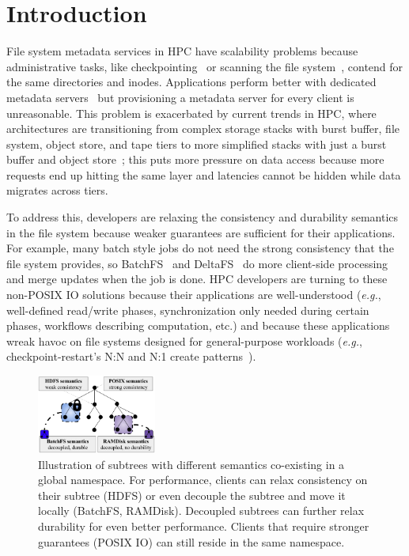 \section{Introduction}

File system metadata services in HPC have scalability problems because
administrative tasks, like checkpointing~\cite{bent_plfs_2009} or scanning the
file system~\cite{zheng:pdsw2014-batchfs}, contend for the same directories and
inodes. Applications perform better with dedicated metadata
servers~\cite{sevilla:sc15-mantle, ren:sc2014-indexfs} but provisioning a
metadata server for every client is unreasonable. This problem is exacerbated
by current trends in HPC, where architectures are transitioning from complex
storage stacks with burst buffer, file system, object store, and tape tiers to
more simplified stacks with just a burst buffer and object
store~\cite{bent:login16-hpc-trends}; this puts more pressure on data access
because more requests end up hitting the same layer and latencies cannot be
hidden while data migrates across tiers.

To address this, developers are relaxing the consistency and durability
semantics in the file system because weaker guarantees are sufficient for their
applications. For example, many batch style jobs do not need the strong
consistency that the file system provides, so
BatchFS~\cite{zheng:pdsw2014-batchfs} and DeltaFS~\cite{zheng:pdsw2015-deltafs}
do more client-side processing and merge updates when the job is done. HPC
developers are turning to these non-POSIX IO solutions because their applications
are well-understood ({\it e.g.}, well-defined read/write phases,
synchronization only needed during certain phases, workflows describing
computation, etc.) and because these applications wreak havoc on file systems designed for
general-purpose workloads ({\it e.g.}, checkpoint-restart's N:N and N:1 create
patterns~\cite{bent_plfs_2009}).

\begin{figure}[tb]
\centering
\includegraphics[width=0.35\textwidth]{figures/subtree-policies1.png}
\caption{ Illustration of subtrees with different semantics co-existing in a
global namespace.  For performance, clients can relax consistency on their
subtree (HDFS) or even decouple the subtree and move it locally (BatchFS,
RAMDisk). Decoupled subtrees can further relax durability for even better
performance.  Clients that require stronger guarantees (POSIX IO) can still reside
in the same namespace.  }\label{fig:subtree-policies}
\end{figure}

